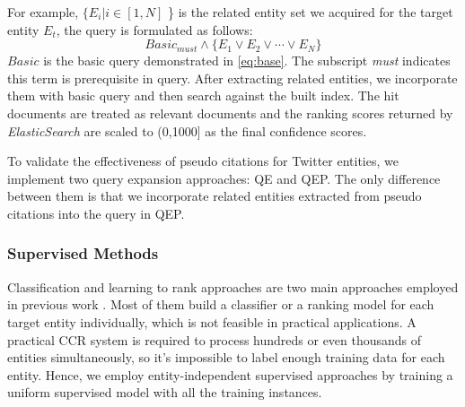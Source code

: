 \documentclass{sig-alternate}
\begin{document}
For example, $\{E_{i}| i \in [1,N]$ \} is the related entity set we acquired for the target entity $E_{t}$, the query is formulated as follows:
\begin{equation}
 Basic_{must} \wedge \{ E_{1} \vee  E_{2} \vee \cdots \vee  E_{N} \}
\end{equation}
$Basic$ is the basic query demonstrated in \autoref{eq:base}. The subscript \textit{must} indicates this term is prerequisite in query. After extracting related entities, we incorporate them with basic query and then search against the built index. The hit documents are treated as relevant documents and the ranking scores returned by \textit{ElasticSearch} are scaled to (0,1000] as the final confidence scores.

To validate the effectiveness of pseudo citations for Twitter entities, we implement two query expansion approaches: QE and QEP. The only difference between them is that we incorporate related entities extracted from pseudo citations into the query in QEP.

\subsubsection{Supervised Methods}\label{sec:supervise}
Classification and learning to rank approaches are two main approaches employed in previous work \cite{Balog:2013:CCR:2484028.2484151, Bonnefoy:2013:WDE:2484028.2484180,araujo2013cwi}.
Most of them build a classifier or a ranking model for each target entity individually, which is not feasible in practical applications. A practical CCR system is required to process hundreds or even thousands of entities simultaneously, so it's impossible to label enough training data for each entity. Hence, we employ entity-independent supervised approaches by training a uniform supervised model with all the training instances.
\end{document}
